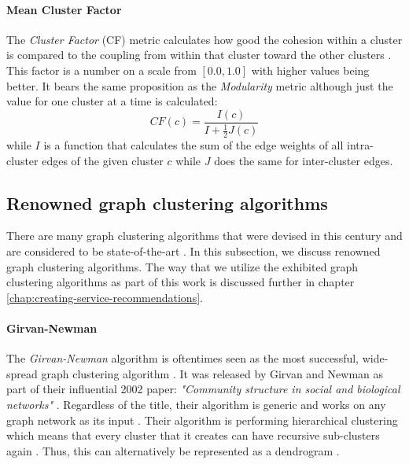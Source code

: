\documentclass[12pt,a4paper]{report}
\begin{document}
\paragraph{Mean Cluster Factor}
The \textit{Cluster Factor} (CF) metric
calculates how good the cohesion within a cluster is compared to the coupling
from within that cluster toward the other clusters \cite{mitchell2006automatic}
. This factor is a number on a scale from \([0.0, 1.0]\) with higher values
being better. It bears the same proposition as the \textit{Modularity} metric
although just the value for one cluster at a time is calculated:
\[
  CF(c) = \frac{I(c)}{I + \frac{1}{2}J(c)}
\]
while $I$ is a function that calculates the
sum of the edge weights of all intra\hyp cluster edges of the given cluster $c$
while $J$ does the same for inter\hyp cluster edges.


\subsection{Renowned graph clustering algorithms} \label{subsect:renowned-graph-clustering-algorithms}

There are many graph clustering algorithms that were devised in this century
and are considered to be state-of-the-art \cite{lancichinetti2009community,
fortunato2010community, danon2005comparing}. In this subsection,
we discuss renowned graph clustering algorithms. The way that we
utilize the exhibited graph clustering algorithms as part of this work is
discussed further in chapter \ref{chap:creating-service-recommendations}.

\paragraph{Girvan-Newman \cite{girvan2002community}}
The \textit{Girvan-Newman}
algorithm is oftentimes seen as the most successful, wide-spread graph
clustering algorithm \cite{lancichinetti2009community}. It was released by
Girvan and Newman as part of their influential 2002 paper: \textit{"Community
structure in social and biological networks"} \cite{girvan2002community}.
Regardless of the title, their algorithm is generic and works on any graph
network as its input \cite{lancichinetti2009community}. Their algorithm is
performing hierarchical clustering which means that every cluster that it
creates can have recursive sub-clusters again \cite{girvan2002community}. Thus,
this can alternatively be represented as a dendrogram \cite{newman2004fast}.
\end{document}
